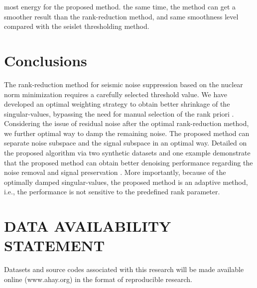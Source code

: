 most  energy for the proposed method.  the same time, the  method can get a smoother result than the rank-reduction method, and same smoothness level compared with the seislet thresholding method.   








\section{Conclusions}
The rank-reduction method for seismic noise suppression based on the nuclear norm minimization requires a carefully selected threshold value. We have developed an optimal weighting strategy to obtain better shrinkage of the singular-values, bypassing the need for manual selection of the rank  priori . Considering the issue of residual noise after the optimal rank-reduction method, we further  optimal way to damp the remaining noise. The proposed method can separate  noise subspace and the signal subspace in an optimal way. Detailed  on the proposed algorithm via two synthetic datasets and one  example demonstrate that the proposed method can obtain better denoising performance regarding the noise removal and signal preservation . More importantly, because of the optimally damped singular-values, the proposed method is an adaptive method, i.e., the performance is not sensitive to the predefined rank parameter.

\section{DATA AVAILABILITY STATEMENT}
Datasets and source codes associated with this research will be made available online (www.ahay.org) in the format of reproducible research.


